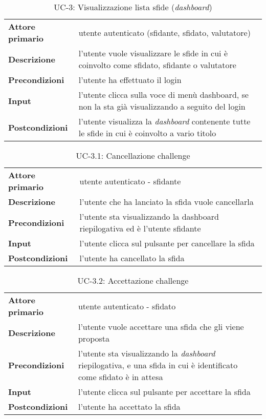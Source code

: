 \begin{table}[H]
    \centering
    \begin{tabular}{|p{3cm}p{11.15cm}|}
        \hline
        \textbf{Attore primario} & utente autenticato (sfidante, sfidato, valutatore) \\
        \textbf{Descrizione} & l’utente vuole visualizzare le sfide in cui è coinvolto come sfidato, sfidante o valutatore \\
        \textbf{Precondizioni} & l’utente ha effettuato il login \\
        \textbf{Input} & l’utente clicca sulla voce di menù dashboard, se non la sta già visualizzando a seguito del login \\
        \textbf{Postcondizioni} & l’utente visualizza la \textit{dashboard} contenente tutte le sfide in cui è coinvolto a vario titolo \\\hline
    \end{tabular}
    \caption{UC-3: Visualizzazione lista sfide (\textit{dashboard})}
\end{table}
\begin{table}[H]
    \centering
    \begin{tabular}{|p{3cm}p{11.15cm}|}
        \hline
        \textbf{Attore primario} & utente autenticato - sfidante \\
        \textbf{Descrizione} & l’utente che ha lanciato la sfida vuole cancellarla \\
        \textbf{Precondizioni} & l’utente sta visualizzando la dashboard riepilogativa ed è l’utente sfidante \\
        \textbf{Input} & l’utente clicca sul pulsante per cancellare la sfida \\
        \textbf{Postcondizioni} & l’utente ha cancellato la sfida \\\hline
    \end{tabular}
    \caption{UC-3.1: Cancellazione challenge}
\end{table}
\begin{table}[H]
    \centering
    \begin{tabular}{|p{3cm}p{11.15cm}|}
        \hline
        \textbf{Attore primario} & utente autenticato - sfidato \\
        \textbf{Descrizione} & l’utente vuole accettare una sfida che gli viene proposta \\
        \textbf{Precondizioni} & l’utente sta visualizzando la \textit{dashboard} riepilogativa, e una sfida in cui è identificato come sfidato è in attesa \\
        \textbf{Input} & l’utente clicca sul pulsante per accettare la sfida \\
        \textbf{Postcondizioni} & l’utente ha accettato la sfida \\\hline
    \end{tabular}
    \caption{UC-3.2: Accettazione challenge}
\end{table}
